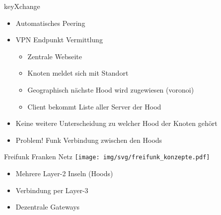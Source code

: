 \begin{frame}{keyXchange}
    \begin{itemize}
        \item \glqq{}Automatisches Peering\grqq{}
        \item VPN Endpunkt Vermittlung
        \begin{itemize}
            \item Zentrale Webseite 
            \item Knoten meldet sich mit Standort
            \item Geographisch nächste Hood wird zugewiesen (voronoi)
            \item Client bekommt Liste aller Server der Hood
        \end{itemize}
        \item Keine weitere Unterscheidung zu welcher Hood der Knoten gehört
        \item<2> {\color{red}Problem!} Funk Verbindung zwischen den Hoods
    \end{itemize}
\end{frame}

\begin{frame}{Freifunk Franken Netz}
    \texttt{[image: img/svg/freifunk\_konzepte.pdf]}

    \begin{itemize}
        \item Mehrere Layer-2 Inseln (Hoods)
        \item Verbindung per Layer-3
        \item Dezentrale Gateways
    \end{itemize}
\end{frame}


